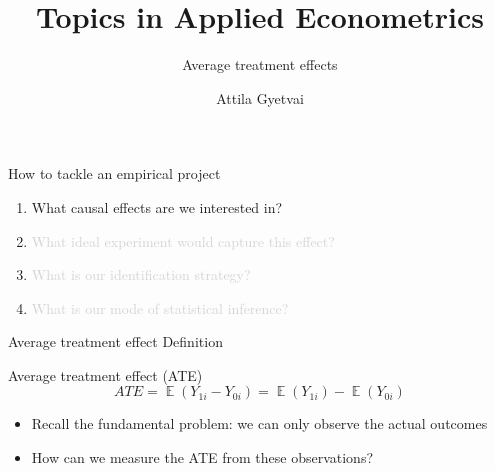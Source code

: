 \documentclass[aspectratio=169,compress,handout,t,xcolor=table]{beamer}
\title{Topics in Applied Econometrics}
\subtitle[]{Average treatment effects}
\author[Attila Gyetvai]{Attila Gyetvai}
\institute[]{Duke Economics \\ Summer 2020}
\date{}
\DeclareMathOperator{\E}{\mathbb{E}}                       %
\begin{document}
{
\begin{frame}
  \titlepage
\end{frame}
}
\addtocounter{framenumber}{-1}

\begin{frame}[c]{How to tackle an empirical project}
  \begin{enumerate}
    \addtolength{\itemsep}{0.5\baselineskip}
    \item What causal effects are we interested in?
    \item \textcolor{lightgray}{What ideal experiment would capture this effect?}
    \item \textcolor{lightgray}{What is our identification strategy?}
    \item \textcolor{lightgray}{What is our mode of statistical inference?}
  \end{enumerate}
\end{frame}

\begin{frame}{Average treatment effect \hspace{0pt plus 1 filll} \large Definition}
  \begin{block}{Average treatment effect (ATE)}
    \begin{equation*}
      ATE = \E(Y_{1i} - Y_{0i}) = \E(Y_{1i}) - \E(Y_{0i})
    \end{equation*}
  \end{block}
  \begin{itemize}
    \item Recall the fundamental problem: we can only observe the actual outcomes
    \item How can we measure the ATE from these observations?
  \end{itemize}
\end{frame}
\end{document}
